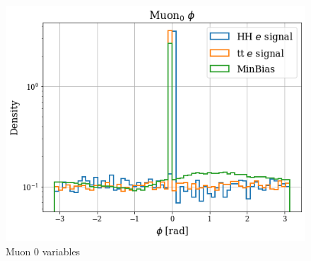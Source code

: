 \documentclass[../main.tex]{subfiles}
\begin{document}
\begin{figure}[!ht]
\begin{minipage}[b]{0.33\linewidth}
    \centering
    \includegraphics[width=1\linewidth]{Chapters/Plots/Hist_1ele_muon0_Phi.png}
  \end{minipage}
  \caption{Muon 0 variables}
\end{figure}
\end{document}
